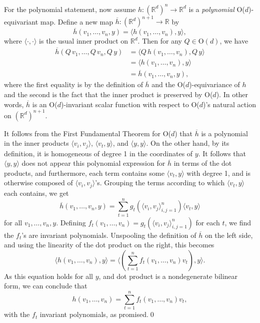 \documentclass{article}
\theoremstyle{Hogg}
\newcommand{\inner}[2]{\langle{#1},{#2}\rangle}
\begin{document}
For the polynomial statement, now assume $h:(\mathbb R^d)^n \rightarrow \mathbb R^d$ is a {\em polynomial} O($d$)-equivariant map. Define a new map $\overline h : (\mathbb R^d)^{n+1}\rightarrow \mathbb R$ by
\begin{equation}
\overline h(v_1,\dots,v_n,y) = \inner{h(v_1,\dots,v_n)} {y},
\end{equation}
where $\langle\cdot,\cdot\rangle$ is the usual inner product on $\mathbb R^d$. Then for any $Q\in \text{O}(d)$, we have
\begin{align*}
\overline h(Q\,v_1,\dots,Q\,v_n,Q\,y)&=\inner{Q\,h(v_1,\dots,v_n)}{ Q\,y} \\
&= \inner{ h(v_1,\dots,v_n)}{ y}\\
&= \overline h(v_1,\dots,v_n,y),
\end{align*}
where the first equality is by the definition of $\overline h$ and the O($d$)-equivariance of $h$ and the second is the fact that the inner product is preserved by O($d$). In other words, $\overline h$ is an O($d$)-invariant scalar function with respect to O($d$)'s natural action on $(\mathbb R^d)^{n+1}$.

It follows from the First Fundamental Theorem for O($d$) that $\overline h$ is a polynomial in the inner products $\inner{v_i}{ v_j}$, $\inner{v_t}{ y}$, and $\inner{y}{y}$. On the other hand, by its definition, it is homogeneous of degree 1 in the coordinates of $y$. It follows that $\inner{y}{y}$ does not appear  this polynomial expression for $\overline h$ in terms of the dot products, and furthermore, each term contains some $\inner{v_t}{y}$ with degree 1, and is otherwise composed of $\inner{v_i}{v_j}$'s. Grouping the terms according to which $\inner{v_t}{ y}$ each contains, we get
\begin{equation}
\overline h(v_1,\dots,v_n,y) = \sum_{t=1}^n g_t( \inner{v_i}{v_j}_{i,j=1}^n) \inner{ v_t}{ y}
\end{equation}
for all $v_1,\dots,v_n,y$. Defining $f_t(v_1,\dots,v_n) = g_t(\inner{v_i}{ v_j}_{i,j=1}^n)$ for each $t$, we find the $f_t$'s are invariant polynomials. Unspooling the definition of $\overline h$ on the left side, and using the linearity of the dot product on the right, this becomes
\begin{equation}
\inner{h(v_1,\dots,v_n)}{ y} = \inner{\left(\sum_{t=1}^n f_t(v_1,\dots,v_n) v_t\right)}{ y}.
\end{equation}
As this equation holds for all $y$, and dot product is a nondegenerate bilinear form, we can conclude that
\begin{equation}
h(v_1,\dots,v_n) = \sum_{t=1}^n f_t(v_1,\dots,v_n) v_t,
\end{equation}
with the $f_t$ invariant polynomials, as promised.\qed
\end{document}
